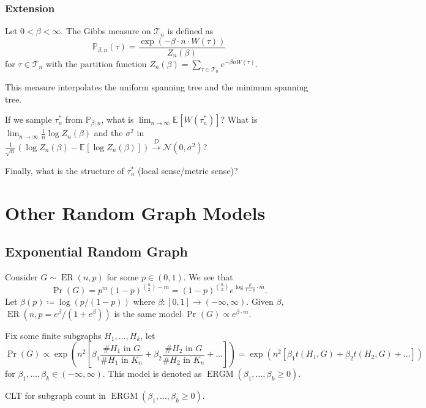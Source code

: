 \subsection{Extension}
Let \(0 < \beta < \infty \). The Gibbs measure on \(\mathcal{T} _n\) is defined as
\[
	\mathbb{P} _{\beta , n}(\tau )
	= \frac{\exp (-\beta \cdot n \cdot W(\tau ))}{Z_n(\beta )}
\]
for \(\tau \in \mathcal{T} _n\) with the partition function \(Z_n(\beta ) = \sum_{\tau \in \mathcal{T} _n} e^{-\beta n W(\tau )}\).

\begin{intuition}
	This measure interpolates the uniform spanning tree and the minimum spanning tree.
\end{intuition}

If we sample \(\tau _n^{\ast} \) from \(\mathbb{P} _{\beta , n}\), what is \(\lim_{n \to \infty} \mathbb{E}_{}[W(\tau _n^{\ast} )] \)? What is \(\lim_{n \to \infty} \frac{1}{n} \log Z_n(\beta )\) and the \(\sigma ^2\) in \(\frac{1}{\sqrt{n} } (\log Z_n(\beta ) - \mathbb{E}_{}[\log Z_n(\beta )] ) \overset{D}{\to} \mathcal{N} (0, \sigma ^2)\)?

Finally, what is the structure of \(\tau _n^{\ast} \) (local sense/metric sense)?

\chapter{Other Random Graph Models}
\section{Exponential Random Graph}
Consider \(G \sim \operatorname{ER}(n, p) \) for some \(p \in (0, 1)\). We see that
\[
	\Pr_{}\left(G\right)
	= p^{m} (1 - p)^{\binom{n}{2} - m}
	= (1 - p)^{\binom{n}{2}} e^{\log \frac{p}{1-p} \cdot m}.
\]
Let \(\beta (p) \coloneqq \log (p / (1 - p))\) where \(\beta \colon [0, 1] \to (-\infty , \infty )\). Given \(\beta \), \(\operatorname{ER}(n, p = e^\beta / (1 + e^{\beta })) \) is the same model \(\Pr_{}\left(G\right) \propto e^{\beta \cdot m}\).

Fix some finite subgraphs \(H_1, \dots , H_k\), let
\[
	\Pr_{}\left(G\right)
	\propto \exp (n^2 \left[ \beta _1 \frac{\text{\#\(H_1\) in \(G\)}}{\text{\#\(H_1\) in \(K_n\)}} + \beta _2 \frac{\text{\#\(H_2\) in \(G\)}}{\text{\#\(H_2\) in \(K_n\)}} + \dots  \right] )
	= \exp (n^2 \left[ \beta _1 t(H_1, G) + \beta _2 t(H_2, G) + \dots  \right] )
\]
for \(\beta _1, \dots , \beta _k \in (-\infty , \infty )\). This model is denoted as \(\operatorname{ERGM}(\beta _1, \dots , \beta _k \geq 0) \).

\begin{problem*}
	CLT for subgraph count in \(\operatorname{ERGM}(\beta _1, \dots , \beta _k \geq 0) \).
\end{problem*}